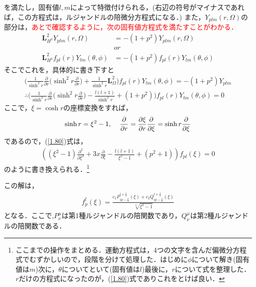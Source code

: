 を満たし，固有値$l,m$によって特徴付けられる，(右辺の符号がマイナスであれば，この方程式は，ルジャンドルの陪微分方程式になる．)
また，$Y_{plm}(r,\Omega)$の部分は，\textcolor{red}{あとで確認するように，次の固有値方程式を満たすことがわかる．}
\begin{align}
  \bm{L}_{H^3}^2Y_{plm}(r,\Omega)&=-(1+p^2)Y_{plm}(r,\Omega) \\
  &or \\
 \bm{L}_{H^3}^2f_{pl}(r)Y_{lm}(\theta,\phi)&=-(1+p^2)f_{pl}(r)Y_{lm}(\theta,\phi)
\end{align}
そこでこれを，具体的に書き下すと
\begin{align}
\biggl(\frac{1}{\sinh^2r}\frac{\partial}{\partial r}\biggl(\sinh^2r\frac{\partial}{\partial r}\biggr)+\frac{1}{\sinh^2r}\bm{L}_{\Omega}^2\biggr)f_{pl}(r)Y_{lm}(\theta,\phi)=-(1+p^2)Y_{plm} \\
\label{1.80}
\therefore\biggl(\frac{1}{\sinh^2r}\frac{\partial}{\partial r}\biggl(\sinh^2r\frac{\partial}{\partial r}\biggr)-\frac{l(l+1)}{\sinh^2r}+(1+p^2)\biggr)f_{pl}(r)Y_{lm}(\theta,\phi)=0
\end{align}
ここで，$\xi=\cosh r$の座標変換をすれば，
\begin{align}
  \sinh r=\xi^2 -1, \hspace{4mm} \frac{\partial}{\partial r}=\frac{\partial \xi}{\partial r}\frac{\partial}{\partial \xi}=\sinh r\frac{\partial}{\partial \xi}
\end{align}
であるので，(\ref{1.80})式は，
\begin{align}
  \label{1.81}
\left(\left(\xi^2-1\right)\frac{\partial^2}{\partial \xi^2}+3 x \frac{\partial}{\partial \xi}-\frac{l (l+1)}{\xi^2-1}+(p^2+1)\right)f_{pl}(\xi)=0
\end{align}
のように書き換えられる．\footnote{ここまでの操作をまとめる．運動方程式は，4つの文字を含んだ偏微分方程式でむずかしいので，段階を分けて処理した．はじめに$\phi$について解き(固有値は$m$)次に，$\theta$についてといて(固有値は$l$)最後に，$r$について式を整理した．$r$だけの方程式になったのが，(\ref{1.80})式でありこれをとけば良い．}

この解は，\begin{align}
  f^l_p(\xi)=\frac{c_1 P_{i p-\frac{1}{2}}^{l+\frac{1}{2}}(\xi)+c_2 Q_{i p-\frac{1}{2}}^{l+\frac{1}{2}}(\xi)}{\sqrt[4]{\xi^2-1}}
\end{align}
となる．ここで,$P^{\mu}_{\nu}$は第1種ルジャンドルの陪関数であり，$Q^{\mu}_{\nu}$は第2種ルジャンドルの陪関数である．

